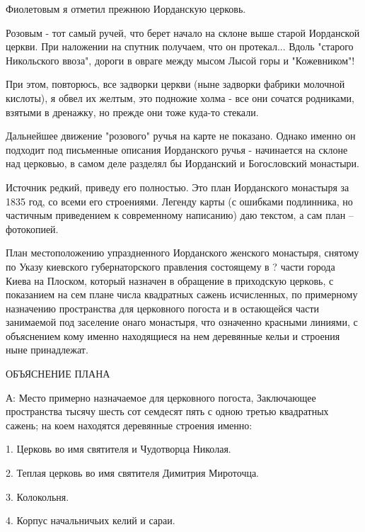 Фиолетовым я отметил прежнюю Иорданскую церковь.

Розовым - тот самый ручей, что берет начало на склоне выше старой Иорданской церкви. При наложении на спутник получаем, что он протекал... Вдоль "старого Никольского ввоза", дороги в овраге между мысом Лысой горы и "Кожевником"!

При этом, повторюсь, все задворки церкви (ныне задворки фабрики молочной кислоты), я обвел их желтым, это подножие холма - все они сочатся родниками, взятыми в дренажку, но прежде они тоже куда-то стекали.

Дальнейшее движение "розового" ручья на карте не показано. Однако именно он подходит под письменные описания Иорданского ручья - начинается на склоне над церковью, в самом деле разделял бы Иорданский и Богословский монастыри.




Источник редкий, приведу его полностью. Это план Иорданского монастыря за 1835 год, со всеми его строениями. Легенду карты (с ошибками подлинника, но частичным приведением к современному написанию) даю текстом, а сам план – фотокопией.

План местоположению упраздненного Иорданского женского монастыря, снятому по Указу киевского губернаторского правления состоящему в ? части города Киева на Плоском, который назначен в обращение в приходскую церковь, с показанием на сем плане числа квадратных сажень исчисленных, по примерному назначению пространства для церковного погоста и в остающейся части занимаемой под заселение онаго монастыря, что означенно красными линиями, с объяснением кому именно находящиеся на нем деревянные кельи и строения ныне принадлежат.

ОБЪЯСНЕНИЕ ПЛАНА

А: Место примерно назначаемое для церковного погоста, Заключающее пространства тысячу шесть сот семдесят пять с одною третью квадратных сажень; на коем находятся деревянные строения именно:

1. Церковь во имя святителя и Чудотворца Николая.

2. Теплая церковь во имя святителя Димитрия Мироточца.

3. Колокольня. 

4. Корпус начальничьих келий и сараи.

